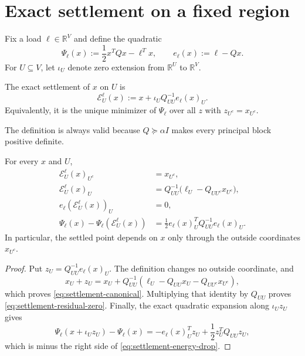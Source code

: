 \section{Exact settlement on a fixed region}
\label{sec:settlement}

Fix a load $\ell\in\mathbb R^V$ and define the quadratic
\begin{equation}
 \Psi_\ell(x):=\frac12x^TQx-\ell^Tx,
 \qquad
 e_\ell(x):=\ell-Qx.
 \label{eq:load-quadratic}
\end{equation}
For $U\subseteq V$, let $\iota_U$ denote zero extension from
$\mathbb R^U$ to $\mathbb R^V$.

\begin{definition}
\label{def:dirichlet-settlement}
The exact settlement of $x$ on $U$ is
\begin{equation}
 \mathcal E_U^\ell(x)
 :=x+\iota_UQ_{UU}^{-1}e_\ell(x)_U.
 \label{eq:dirichlet-settlement}
\end{equation}
Equivalently, it is the unique minimizer of $\Psi_\ell$ over all $z$ with
$z_{U^c}=x_{U^c}$.
\end{definition}

The definition is always valid because $Q\succeq\alpha I$ makes every
principal block positive definite.

\begin{lemma}
\label{lem:canonical-settlement}
For every $x$ and $U$,
\begin{align}
 \mathcal E_U^\ell(x)_{U^c}&=x_{U^c},
 \label{eq:settlement-outside}\\
 \mathcal E_U^\ell(x)_U
 &=Q_{UU}^{-1}\bigl(\ell_U-Q_{UU^c}x_{U^c}\bigr),
 \label{eq:settlement-canonical}\\
 e_\ell(\mathcal E_U^\ell(x))_U&=0,
 \label{eq:settlement-residual-zero}\\
 \Psi_\ell(x)-\Psi_\ell(\mathcal E_U^\ell(x))
 &=\frac12 e_\ell(x)_U^TQ_{UU}^{-1}e_\ell(x)_U.
 \label{eq:settlement-energy-drop}
\end{align}
In particular, the settled point depends on $x$ only through the outside
coordinates $x_{U^c}$.
\end{lemma}

\begin{proof}
Put $z_U=Q_{UU}^{-1}e_\ell(x)_U$.  The definition changes no outside
coordinate, and
\[
 x_U+z_U
 =x_U+Q_{UU}^{-1}
   (\ell_U-Q_{UU}x_U-Q_{UU^c}x_{U^c}),
\]
which proves \cref{eq:settlement-canonical}.  Multiplying that identity by
$Q_{UU}$ proves \cref{eq:settlement-residual-zero}.  Finally, the exact
quadratic expansion along $\iota_Uz_U$ gives
\[
 \Psi_\ell(x+\iota_Uz_U)-\Psi_\ell(x)
 =-e_\ell(x)_U^Tz_U+\frac12z_U^TQ_{UU}z_U,
\]
which is minus the right side of \cref{eq:settlement-energy-drop}.
\end{proof}


